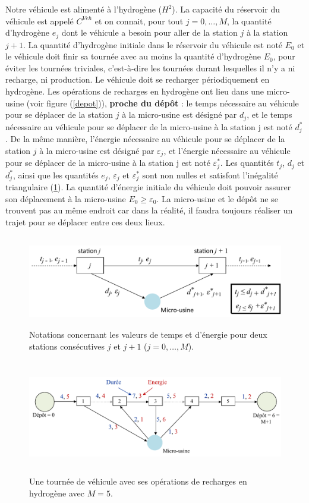 Notre véhicule est alimenté à l'hydrogène ($H^2$). La capacité du réservoir du véhicule est appelé $C^{Veh}$ et on connait, pour tout $j=0, \dots, M$, la quantité d'hydrogène $e_j$ dont le véhicule a besoin pour aller de la station $j$ à la station $j+1$. La quantité d'hydrogène initiale dans le réservoir du véhicule est noté $E_0$ et le véhicule doit finir sa tournée avec au moins la quantité d'hydrogène $E_0$, pour éviter les tournées triviales, c'est-à-dire les tournées durant lesquelles il n'y a ni recharge, ni production. Le véhicule doit se recharger périodiquement en hydrogène. Les opérations de recharges en hydrogène ont lieu dans une micro-usine (voir figure (\ref{depot})), \textbf{proche du dépôt} : le temps nécessaire au véhicule pour se déplacer de la station $j$
à la micro-usine est désigné par $d_j$, et le temps nécessaire au véhicule pour se déplacer de la micro-usine à la station j est noté $d^*_j$. De la même manière, l'énergie nécessaire au véhicule pour se déplacer de la station $j$ à la micro-usine est désigné par $\varepsilon_j$, et l'énergie nécessaire au véhicule pour se déplacer de la micro-usine à la station j est noté $\varepsilon^*_j$. Les quantités $t_j$, $d_j$ et $d^*_j$, ainsi que les quantités $e_j$, $\varepsilon_j$ et $\varepsilon^*_j$ sont non nulles et satisfont l'inégalité triangulaire (\ref{Notation_inputs}). La quantité d'énergie initiale du véhicule doit pouvoir assurer son déplacement à la micro-usine $E_0\geq \varepsilon_0$. La micro-usine et le dépôt ne se trouvent pas au même endroit car dans la réalité, il faudra toujours réaliser un trajet pour se déplacer entre ces deux lieux.
\begin{figure}[H]
	\centerline{
		\includegraphics[height=4cm]{images_these/Notation_inputs.pdf}}
	\caption[Notations concernant les valeurs de temps et d'énergie]{Notations concernant les valeurs de temps et d'énergie pour deux stations consécutives $j$ et $j+1$ ($j = 0, \dots, M$). }
	\label{Notation_inputs}
\end{figure}
\begin{figure}[H]
	\centerline{
		\includegraphics[height=5cm]{images_these/Trip.pdf}}
	\caption[Une tournée de véhicule]{Une tournée de véhicule avec ses opérations de recharges en hydrogène avec $M=5$. }
	\label{Trip}
\end{figure}
